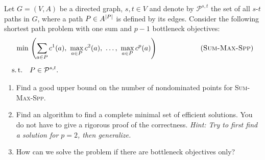 \documentclass[11pt,a4paper,parskip=half-]{scrartcl}
\begin{document}
\maketitle

\inclass
\begin{exercise}{}
Let $G=(V,A)$ be a directed graph, $s, t \in V$ and denote by
$\mathcal P^{s,t}$ the set of all $s$-$t$ paths in $G$, where a path
$P \in A^{\left\lvert P \right\rvert}$ is defined by its edges.
Consider the following shortest path problem with one sum and $p-1$ bottleneck objectives:
\begin{align*}
\min \,&\left( \sum_{a \in P} c^{1}(a) , \ \max_{a \in P} c^{2}(a), \ \ldots , \ \max_{a \in P} c^{p}(a) \right) \qquad \qquad \tag{\textsc{Sum-Max-Spp}}\\[1.2ex]
\text{s.\,t.}\quad & P \in \mathcal P^{s,t}.
\end{align*}
\begin{enumerate}
	\item Find a good upper bound on the number of nondominated points for \textsc{Sum-Max-Spp}.
        \item Find an algorithm to find a complete minimal set of efficient solutions. You do not have to give a rigorous proof of the correctness. \emph{Hint: Try to first find a solution for $p=2$, then generalize.}
        \item How can we solve the problem if there are bottleneck objectives only?
\end{enumerate}
\end{exercise}
\end{document}
